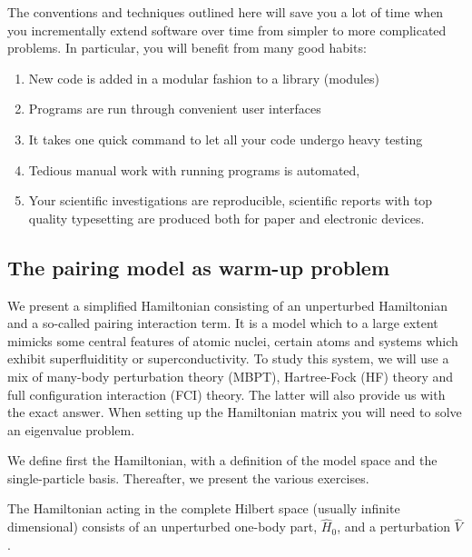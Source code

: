 \documentclass[%
twoside,                 %
final,                   %
10pt]{article}
\begin{document}
\noindent
The conventions and techniques outlined here will save you a lot of time when you incrementally extend software over time from simpler to more complicated problems. In particular, you will benefit from many good habits:
\begin{enumerate}
\item New code is added in a modular fashion to a library (modules)

\item Programs are run through convenient user interfaces

\item It takes one quick command to let all your code undergo heavy testing 

\item Tedious manual work with running programs is automated,

\item Your scientific investigations are reproducible, scientific reports with top quality typesetting are produced both for paper and electronic devices.
\end{enumerate}

\noindent
\subsection{The pairing model as warm-up problem}

We present a simplified Hamiltonian consisting of an unperturbed
Hamiltonian and a so-called pairing interaction term. It is a model
which to a large extent mimicks some central features of atomic
nuclei, certain atoms and systems which exhibit superfluiditity or
superconductivity.  To study this system, we will use a mix of
many-body perturbation theory (MBPT), Hartree-Fock (HF) theory and full
configuration interaction (FCI) theory. The latter will also provide us with
the exact answer.  When setting up the Hamiltonian matrix you will
need to solve an eigenvalue problem.

We define first the Hamiltonian, with a definition of the model space
and the single-particle basis. Thereafter, we present the various
exercises.


The Hamiltonian acting in the complete Hilbert space (usually infinite
dimensional) consists of an unperturbed one-body part, $\hat{H}_0$,
and a perturbation $\hat{V}$.
\end{document}
